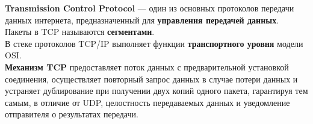\textbf{Transmission Control Protocol} — один из основных протоколов передачи данных интернета, предназначенный для \textbf{управления передачей данных}. Пакеты в TCP называются \textbf{сегментами}.\\


В стеке протоколов TCP/IP выполняет функции \textbf{транспортного уровня} модели OSI.\\


\textbf{Механизм TCP} предоставляет поток данных с предварительной установкой соединения, осуществляет повторный запрос данных в случае потери данных и устраняет дублирование при получении двух копий одного пакета, гарантируя тем самым, в отличие от UDP, целостность передаваемых данных и уведомление отправителя о результатах передачи.\\


